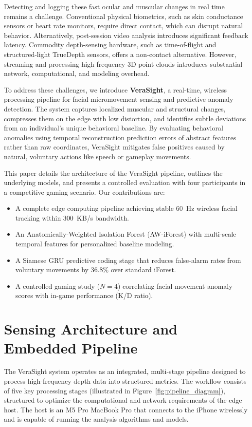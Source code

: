 \documentclass[sigconf]{acmart}
\begin{document}
Detecting and logging these fast ocular and muscular changes in real time remains a challenge. Conventional physical biometrics, such as skin conductance sensors or heart rate monitors, require direct contact, which can disrupt natural behavior. Alternatively, post-session video analysis introduces significant feedback latency. Commodity depth-sensing hardware, such as time-of-flight and structured-light TrueDepth sensors, offers a non-contact alternative. However, streaming and processing high-frequency 3D point clouds introduces substantial network, computational, and modeling overhead.

To address these challenges, we introduce \textbf{VeraSight}, a real-time, wireless processing pipeline for facial micromovement sensing and predictive anomaly detection. The system captures localized muscular and structural changes, compresses them on the edge with low distortion, and identifies subtle deviations from an individual's unique behavioral baseline. By evaluating behavioral anomalies using temporal reconstruction prediction errors of abstract features rather than raw coordinates, VeraSight mitigates false positives caused by natural, voluntary actions like speech or gameplay movements.

This paper details the architecture of the VeraSight pipeline, outlines the underlying models, and presents a controlled evaluation with four participants in a competitive gaming scenario. Our contributions are:
\begin{itemize}
    \item A complete edge computing pipeline achieving stable 60~Hz wireless facial tracking within 300~KB/s bandwidth.
    \item An Anatomically-Weighted Isolation Forest (AW-iForest) with multi-scale temporal features for personalized baseline modeling.
    \item A Siamese GRU predictive coding stage that reduces false-alarm rates from voluntary movements by 36.8\% over standard iForest.
    \item A controlled gaming study ($N=4$) correlating facial movement anomaly scores with in-game performance (K/D ratio).
\end{itemize}

\section{Sensing Architecture and Embedded Pipeline}

The VeraSight system operates as an integrated, multi-stage pipeline designed to process high-frequency depth data into structured metrics. The workflow consists of five key processing stages (illustrated in Figure~\ref{fig:pipeline_diagram}), structured to optimize the computational and network requirements of the edge host. The host is an M5 Pro MacBook Pro that connects to the iPhone wirelessly and is capable of running the analysis algorithms and models.
\end{document}
